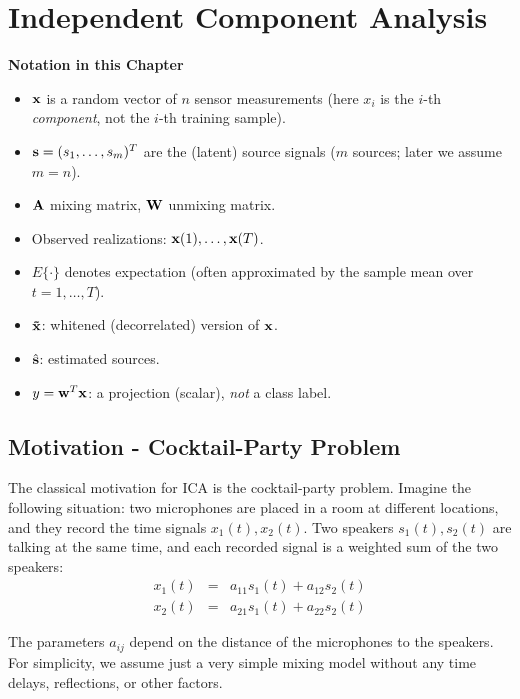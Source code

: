 \def\kurt{\mathop{\mathsf{kurt}}}
\def\MI{\mathop{\mathsf{MI}}}
\def\KL{\mathop{\mathsf{D}_{\mathsf{KL}}}}

\section{Independent Component Analysis}\autocite{hyvarinen2000,cover2006}

\textbf{Notation in this Chapter}\\
{\small
\begin{itemize}
  \item $\bm{\mathrm{x}}$ is a random vector of $n$ sensor measurements (here $x_i$ is the $i$-th \emph{component}, not the $i$-th training sample).
  \item $\bm{\mathrm{s}}=(s_1,\dots,s_m)^T$ are the (latent) source signals ($m$ sources; later we assume $m=n$).
  \item $\mathbf{A}$ mixing matrix, $\mathbf{W}$ unmixing matrix.
  \item Observed realizations: $\bm{\mathrm{x}}(1),\dots,\bm{\mathrm{x}}(T)$.
  \item $E\{\cdot\}$ denotes expectation (often approximated by the sample mean over $t=1,\dots,T$).
  \item $\bm{\mathrm{\tilde x}}$: whitened (decorrelated) version of $\bm{\mathrm{x}}$.
  \item $\hat{\bm{\mathrm{s}}}$: estimated sources.
  \item $y=\bm{\mathrm{w}}^T\bm{\mathrm{x}}$: a projection (scalar), \emph{not} a class label.
\end{itemize}
}

\subsection{Motivation - Cocktail-Party Problem}
  The classical motivation for ICA is the cocktail-party problem. Imagine the following situation: two microphones are placed in a room at different locations, and they record the time signals $x_1(t), x_2(t)$. Two speakers $s_1(t), s_2(t)$ are talking at the same time, and each recorded signal is a weighted sum of the two speakers:
 \begin{eqnarray*}
      x_1(t) &=& a_{11} s_1(t) + a_{12} s_2(t) \\
      x_2(t) &=& a_{21} s_1(t) + a_{22} s_2(t)
    \end{eqnarray*}

    The parameters $a_{ij}$ depend on the distance of the microphones to the speakers. For simplicity, we assume just a very simple mixing model without any time delays, reflections, or other factors.  

